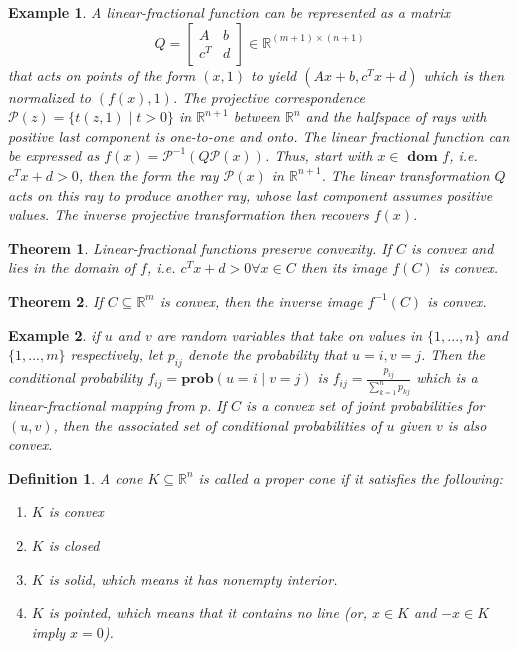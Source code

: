 \documentclass[a4paper]{article}
\newtheorem{mytheorem}{Theorem}
\newtheorem{example}{Example}
\newtheorem{mydef}{Definition}
\numberwithin{mytheorem}{section}
\numberwithin{mydef}{section}
\numberwithin{example}{section}
\begin{document}
\begin{example} A linear-fractional function can be represented as a matrix \[ Q = \begin{bmatrix}
A & b\\
c^{T} & d
\end{bmatrix} \in  \mathbb{R}^{(m+1) \times (n+1)} \] that acts on points of the form $(x,1)$ to yield $(Ax + b, c^{T}x + d)$ which is then normalized to $(f(x),1)$. The projective correspondence $\mathcal{P}(z) = \{ t(z,1) \mid t > 0 \}$ in $\mathbb{R}^{n+1}$ between $\mathbb{R}^{n}$ and the halfspace of rays with positive last component is one-to-one and onto. The linear fractional function can be expressed as $f(x) = \mathcal{P}^{-1}(Q\mathcal{P}(x))$. Thus, start with $x \in \textbf{ dom } f$, i.e. $c^{T}x + d > 0$, then the form the ray $\mathcal{P}(x)$ in $\mathbb{R}^{n+1}$. The linear transformation $Q$ acts on this ray to produce another ray, whose last component assumes positive values. The inverse projective transformation then recovers $f(x)$. 
\end{example}

\begin{mytheorem} Linear-fractional functions preserve convexity. If $C$ is convex and lies in the domain of $f$, i.e. $c^{T}x + d > 0 \forall x \in C$ then its image $f(C)$ is convex. 
\end{mytheorem}

\begin{mytheorem} If $C \subseteq \mathbb{R}^{m}$ is convex, then the inverse image $f^{-1}(C)$ is convex.
\end{mytheorem}

\begin{example} if $u$ and $v$ are random variables that take on values in $\{1,...,n \}$ and $\{1,...,m \}$ respectively, let $p_{ij}$ denote the probability that $u = i, v = j$. Then the conditional probability $f_{ij} = \textbf{prob}(u = i \mid v = j)$ is $ f_{ij} = \frac{p_{ij}}{\sum^{n}_{k = 1} p_{kj}}$ which is a linear-fractional mapping from $p$. If $C$ is a convex set of joint probabilities for $(u,v)$, then the associated set of conditional probabilities of $u$ given $v$ is also convex.
\end{example}

\begin{mydef} A cone $K \subseteq \mathbb{R}^{n}$ is called a proper cone if it satisfies the following:
\begin{enumerate}
\item $K$ is convex
\item $K$ is closed
\item $K$ is solid, which means it has nonempty interior.
\item $K$ is pointed, which means that it contains no line (or, $x \in K$ and $-x \in K$ imply $x = 0$). 
\end{enumerate}
\end{mydef}
\end{document}
